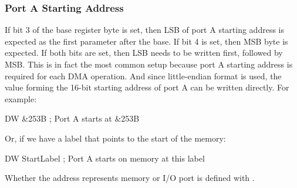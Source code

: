 \subsubsection{Port A Starting Address}

If bit 3 of the base register byte is set, then LSB of port A starting address is expected as the first parameter after the base. If bit 4 is set, then MSB byte is expected. If both bits are set, then LSB needs to be written first, followed by MSB. This is in fact the most common setup because port A starting address is required for each DMA operation. And since little-endian format is used, the value forming the 16-bit starting address of port A can be written directly. For example:

\begin{tcblisting}{}
	DW &253B          ; Port A starts at &253B
\end{tcblisting}
\vspace*{-1ex}

Or, if we have a label that points to the start of the memory:

\begin{tcblisting}{}
	DW StartLabel     ; Port A starts on memory at this label
\end{tcblisting}
\vspace*{-1ex}

Whether the address represents memory or I/O port is defined with .


